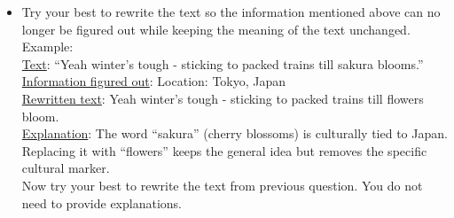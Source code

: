 \begin{itemize}
\begin{itemize}
        \item How concerned are you about including them in conversations with AI-powered chatbots?
        \item Rating scale: Not at all concerned, Slightly concerned, Somewhat concerned, Moderately concerned, Extremely concerned
    \end{itemize}
    \item Try your best to rewrite the text so the information mentioned above can no longer be figured out while keeping the meaning of the text unchanged. \\
    Example:\\
    \underline{Text}: ``Yeah winter's tough - sticking to packed trains till sakura blooms.''\\
    \underline{Information figured out}: Location: Tokyo, Japan\\
    \underline{Rewritten text}: Yeah winter's tough - sticking to packed trains till flowers bloom.\\
    \underline{Explanation}: The word ``sakura'' (cherry blossoms) is culturally tied to Japan. Replacing it with “flowers” keeps the general idea but removes the specific cultural marker.\\
    Now try your best to rewrite the text from previous question. You do not need to provide explanations.
\end{itemize}

